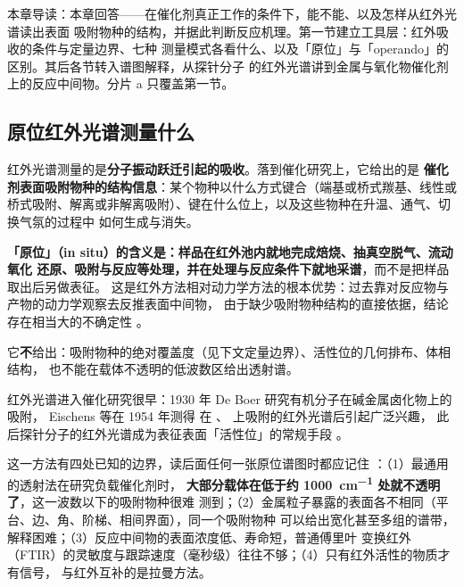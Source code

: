 
%
{本章导读：本章回答——在催化剂真正工作的条件下，能不能、以及怎样从红外光谱读出表面
吸附物种的结构，并据此判断反应机理。第一节建立工具层：红外吸收的条件与定量边界、七种
测量模式各看什么、以及「原位」与「operando」的区别。其后各节转入谱图解释，从探针分子
的红外光谱讲到金属与氧化物催化剂上的反应中间物。分片 a 只覆盖第一节。}
\label{ch:07}

\subsection{原位红外光谱测量什么}

\begin{probout}
红外光谱测量的是\textbf{分子振动跃迁引起的吸收}。落到催化研究上，它给出的是
\textbf{催化剂表面吸附物种的结构信息}：某个物种以什么方式键合（端基或桥式羰基、线性或
桥式吸附、解离或非解离吸附）、键在什么位上，以及这些物种在升温、通气、切换气氛的过程中
如何生成与消失。

\textbf{「原位」（in situ）的含义是：样品在红外池内就地完成焙烧、抽真空脱气、流动氧化
还原、吸附与反应等处理，并在处理与反应条件下就地采谱}，而不是把样品取出后另做表征。
这是红外方法相对动力学方法的根本优势：过去靠对反应物与产物的动力学观察去反推表面中间物，
由于缺少吸附物种结构的直接依据，结论存在相当大的不确定性
。

它\textbf{不}给出：吸附物种的绝对覆盖度（见下文定量边界）、活性位的几何排布、体相结构，
也不能在载体不透明的低波数区给出透射谱。
\end{probout}

红外光谱进入催化研究很早：1930 年 De Boer 研究有机分子在碱金属卤化物上的吸附，
Eischens 等在 1954 年测得  在 、 上吸附的红外光谱后引起广泛兴趣，
此后探针分子的红外光谱成为表征表面「活性位」的常规手段
。

这一方法有四处已知的边界，读后面任何一张原位谱图时都应记住
：（1）最通用的透射法在研究负载催化剂时，
\textbf{大部分载体在低于约 \qty{1000}{cm^{-1}} 处就不透明了}，这一波数以下的吸附物种很难
测到；（2）金属粒子暴露的表面各不相同（平台、边、角、阶梯、相间界面），同一个吸附物种
可以给出宽化甚至多组的谱带，解释困难；（3）反应中间物的表面浓度低、寿命短，普通傅里叶
变换红外（FTIR）的灵敏度与跟踪速度（毫秒级）往往不够；（4）只有红外活性的物质才有信号，
与红外互补的是拉曼方法。


